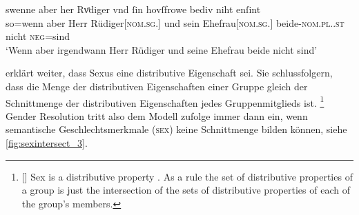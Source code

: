 \begin{exe}
\ex \label{ex:gendres2}
		\gll swenne aber her Rvͦdiger vnd ſin
			hovſfrowe bediv niht enſint\\
			so=wenn aber Herr Rüdiger[\textsc{nom.sg.\MascM}] und sein
			Ehefrau[\textsc{nom.sg.\FemF}] beide-\textsc{nom.pl.\NeutMF.st} nicht
			\textsc{neg}=sind\\
		\trans `Wenn aber irgendwann Herr Rüdiger und seine Ehefrau
			beide nicht  sind'
			\parencites(Nr.~3262, Regensburg, 1299)[425,13--14]{cao4}
\end{exe}

\citet[576]{wechsler2009} \citep[vgl.~auch][182]{wechslerzlatic2003} erklärt
weiter, dass Sexus eine distributive Eigenschaft sei. Sie schlussfolgern, dass
die Menge der distributiven Eigenschaften einer Gruppe gleich der Schnittmenge
der distributiven Eigenschaften jedes Gruppenmitglieds ist.%
%
	\footnote{[{\cites[576]{wechsler2009}[vgl.][182]{wechslerzlatic2003}}]{%
		Sex is a distributive property \textelp{}. As a rule the set of
		distributive properties of a group is just the intersection of the sets
		of distributive properties of each of the group's members}.
	}
%
Gender Resolution tritt also dem Modell zufolge immer dann ein, wenn
semantische Geschlechtsmerkmale (\textsc{sex}) keine Schnittmenge bilden können, siehe
\cref{fig:sexintersect_3}.

